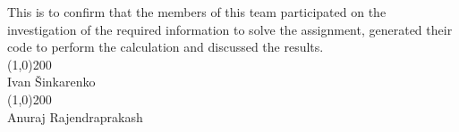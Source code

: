 \documentclass{article}
\def\authorivan{Ivan \v Sinkarenko}
\def\authoranu{Anuraj Rajendraprakash}
\begin{document}
This is to confirm that the members of this team participated on the investigation of the required information to solve the assignment, generated their code to perform the calculation and discussed the results.\\
\vspace{2cm}
\newline
\line(1,0){200}\\
\authorivan\\
\vspace{2cm}
\newline
\line(1,0){200}\\
\authoranu\\
\end{document}
